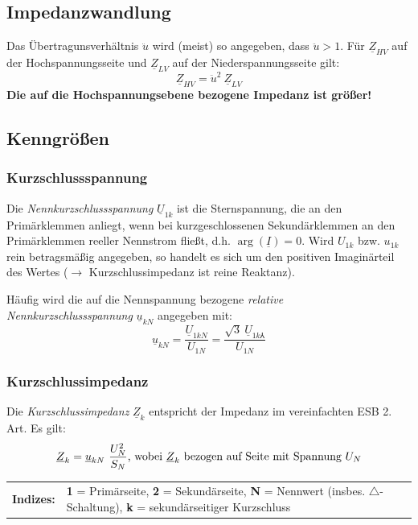 \documentclass[a4paper, 11pt]{article}
\begin{document}
\subsection*{Impedanzwandlung}
Das Übertragunsverhältnis $\ddot u$ wird (meist) so angegeben, dass $\ddot u > 1$. Für $\underline Z_{HV}$ auf der Hochspannungsseite und $\underline Z_{LV}$ auf der Niederspannungsseite gilt:
\[
	\underline Z_{HV} = \ddot u^2 ~ \underline Z_{LV}
\]
\textbf{Die auf die Hochspannungsebene bezogene Impedanz ist größer!}

\subsection*{Kenngrößen}
\subsubsection*{Kurzschlussspannung}
Die \textit{Nennkurzschlussspannung} $\underline U_{1k}$ ist die Sternspannung, die an den Primärklemmen anliegt, wenn bei kurzgeschlossenen Sekundärklemmen an den Primärklemmen reeller Nennstrom fließt, d.h. $\arg(\underline I) = 0$. Wird $U_{1k}$ bzw. $u_{1k}$ rein betragsmäßig angegeben, so handelt es sich um den positiven Imaginärteil des Wertes ($\rightarrow$ Kurzschlussimpedanz ist reine Reaktanz).

\vspace{.5em}
Häufig wird die auf die Nennspannung bezogene \textit{relative Nennkurzschlussspannung} $\underline u_{kN}$ angegeben mit:
\[
	\underline u_{kN} = \frac{\underline U_{1kN}}{U_{1N}} = \frac{\sqrt{3} ~ \underline U_{1k\Yup}}{U_{1N}}
\]

\subsubsection*{Kurzschlussimpedanz}
Die \textit{Kurzschlussimpedanz} $\underline Z_k$ entspricht der Impedanz im vereinfachten ESB 2. Art. Es gilt:
\[
	\underline Z_k = \underline u_{kN} ~ \frac{U_N^2}{S_N} \textnormal{, wobei $\underline Z_k$ bezogen auf Seite mit Spannung $U_N$}
\]

\raggedright
\vspace{12pt}
\footnotesize
\begin{tabular}{r p{13cm}}
	\sffamily\textbf{Indizes:} & \rmfamily \textbf{1} = Primärseite, \textbf{2} = Sekundärseite, \textbf{N} = Nennwert (insbes. $\triangle$-Schaltung), \textbf{k} = sekundärseitiger Kurzschluss
\end{tabular}
\normalsize
\end{document}
